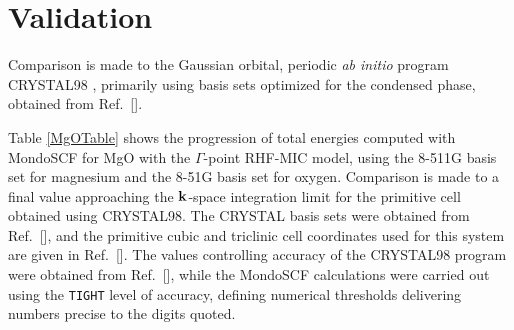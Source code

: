 \commentoutA{\documentclass[prb,aps,nobibnotes,twocolumn,doublespace,twocolumngrid,superbib,showpacs]{revtex4}}
\begin{document}


\section{Validation} \label{validation}

Comparison is made to the Gaussian orbital, periodic {\em ab initio} program {\sc CRYSTAL98} \cite{CRYSTAL98}, 
primarily using basis sets optimized for the condensed phase, obtained  from Ref.~[].

Table \ref{MgOTable} shows the progression of total energies computed with {\sc MondoSCF} 
for MgO with the  $\Gamma$-point RHF-MIC model, using the 8-511G basis set for magnesium and the 
8-51G basis set for oxygen.   Comparison is made to a final value approaching the ${\bf k}$-space 
integration limit for the primitive cell obtained using {\sc CRYSTAL98}.   The {\sc CRYSTAL} basis 
sets were obtained from Ref.~[], and the primitive cubic and triclinic cell 
coordinates used for this system are given in Ref.~[].   The values 
controlling accuracy of the {\sc CRYSTAL98} program were obtained from Ref.~[], 
while the {\sc MondoSCF} calculations were carried out using the {\tt TIGHT} level of accuracy, 
defining numerical thresholds delivering numbers precise to the digits quoted. 
\end{document}

